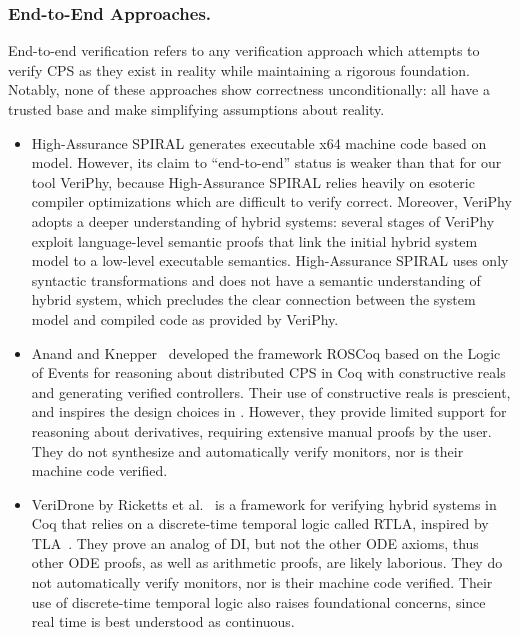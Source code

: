\documentclass[12pt]{cmuthesis}
\theoremstyle{definition}
\theoremstyle{remark}
\newcommand{\rref}[2][]{\prettyref{#2}}
\newcommand{\VeriPhy}{VeriPhy\xspace}
\begin{document}
\subsubsection{End-to-End Approaches.}
End-to-end verification refers to any verification approach which attempts to verify CPS as they exist in reality while maintaining a rigorous foundation.
Notably, none of these approaches show correctness unconditionally: all have a trusted base and make simplifying assumptions about reality.
\begin{itemize}
\item
  High-Assurance SPIRAL \cite{DBLP:journals/csm/FranchettiLMMGPPKMFJPV17} generates executable x64 machine code based on \dL model.
  However, its claim to ``end-to-end'' status is weaker than that for our tool \VeriPhy, because High-Assurance SPIRAL relies heavily on esoteric compiler optimizations which are difficult to verify correct.
  Moreover, \VeriPhy adopts a deeper understanding of hybrid systems: several stages of \VeriPhy exploit language-level semantic proofs that link the initial hybrid system model to a low-level executable semantics.
  High-Assurance SPIRAL uses only syntactic transformations and does not have a semantic understanding of hybrid system, which precludes the clear connection between the system model and compiled code as provided by \VeriPhy.
\item 
Anand and Knepper~\cite{Anand+Knepper:itp:2015} developed the framework ROSCoq based on the Logic of Events for reasoning about distributed CPS in Coq with constructive reals and generating verified controllers.
Their use of constructive reals is prescient, and inspires the design choices in \rref{ch:proofplex}.
However, they provide limited support for reasoning about derivatives, requiring extensive manual proofs by the user.
They do not synthesize and automatically verify monitors, nor is their machine code verified.
\item 
VeriDrone by Ricketts et al.~\cite{Ricketts:memcode:2015} is a framework for verifying hybrid systems in Coq that relies on a discrete-time temporal logic called RTLA, inspired by TLA~\cite{Lamport:hybrid:1992}.
They prove an analog of DI, but not the other ODE axioms, thus other ODE proofs, as well as arithmetic proofs, are likely laborious.
They do not automatically verify monitors, nor is their machine code verified.
Their use of discrete-time temporal logic also raises foundational concerns, since real time is best understood as continuous.
\end{itemize}
\end{document}
